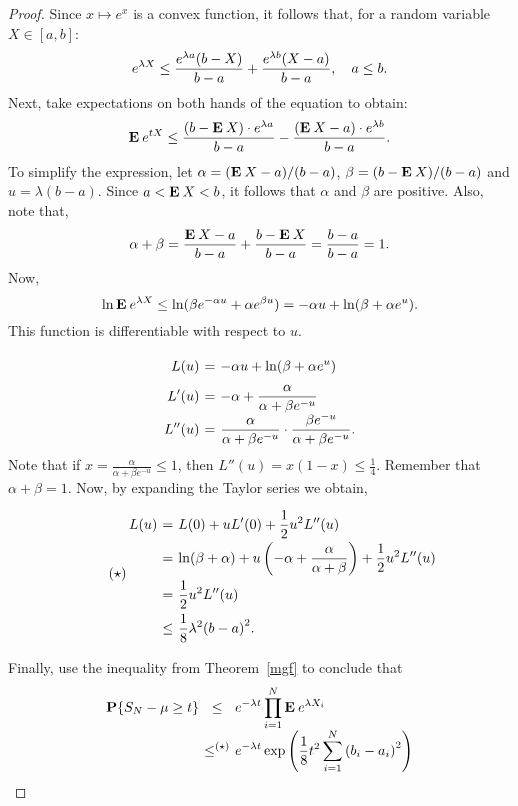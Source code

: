 \begin{proof}
  Since $x \mapsto e^x$ is a convex function, it follows that, for a random variable $X \in [a,b]$:
  \[ e^{\lambda X} \leq \frac{e^{\lambda a}(b-X)}{b-a} + \frac{e^{\lambda b}(X-a)}{b-a},\hspace*{1em} a \leq b. \]
  Next, take expectations on both hands of the equation to obtain:
  \[ \mathbf{E}\: e^{tX} \leq \frac{(b-\mathbf{E}\: X) \cdot e^{\lambda a}}{b-a} - \frac{(\mathbf{E}\: X -a) \cdot e^{\lambda b}}{b-a}. \]
  To simplify the expression, let $\alpha = (\mathbf{E}\: X -a)/(b-a)$, $\beta = (b-\mathbf{E}\: X)/(b-a)$ and $u = \lambda (b-a)$. Since $a < \mathbf{E}\: X < b$, it follows that $\alpha$ and $\beta$ are positive. Also, note that,
  \[ \alpha + \beta = \frac{\mathbf{E}\: X-a}{b-a} + \frac{b-\mathbf{E}\: X}{b-a} = \frac{b-a}{b-a} = 1. \] 
  Now,
  \[ \ln \mathbf{E}\: e^{\lambda X} \leq \ln (\beta e^{-\alpha u} + \alpha e^{\beta u}) = -\alpha u + \ln(\beta + \alpha e^{u}). \] 
  This function is differentiable with respect to $u$.
  \[\everymath{\displaystyle}\arraycolsep=1.8pt\def\arraystretch{1.8}
    \begin{array}{rcl}
    L(u) & = & -\alpha u + \ln(\beta + \alpha e^{u})\\
    L'(u) & = & -\alpha + \frac{\alpha}{\alpha + \beta e^{-u}}\\
    L''(u) & = & \frac{\alpha}{\alpha + \beta e^{-u}} \cdot \frac{\beta e^{-u}}{\alpha + \beta e^{-u}}.
  \end{array} \]
  Note that if $x = \frac{\alpha}{\alpha + \beta e^{-u}} \leq 1$, then $L''(u) = x(1-x) \leq \frac{1}{4}$. Remember that $\alpha + \beta = 1$. Now, by expanding the Taylor series we obtain,
  \begin{equation}
    \tag{$\star$} \everymath{\displaystyle}\arraycolsep=1.8pt\def\arraystretch{2}
  \begin{array}{rcl}
    L(u) & = & L(0) + uL'(0) + \frac{1}{2} u^2 L''(u)\\
    & = &\ln(\beta + \alpha) + u \left(-\alpha + \frac{\alpha}{\alpha + \beta}\right) + \frac{1}{2} u^2 L''(u) \\
    & = & \frac{1}{2} u^2 L''(u)\\
    &\leq & \frac{1}{8}\lambda^2 {(b-a)}^2.
  \end{array}
  \end{equation}

  Finally, use the inequality from Theorem~\ref{mgf} to conclude that
  \[\everymath{\displaystyle}\arraycolsep=1.8pt\def\arraystretch{2}
    \begin{array}{rcl}
      \P\{S_N-\mu \geq t\} & \leq & e^{-\lambda t} \prod_{i = 1}^N \E e^{\lambda X_i} \\
      &\leq^{(\star)} & e^{-\lambda t} \exp\left(\frac{1}{8}t^2 \sum_{i = 1}^{N} {(b_i-a_i)}^2\right)
    \end{array}\]  

\end{proof}



